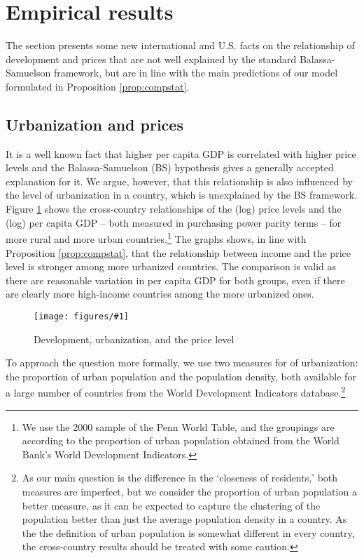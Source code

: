 \documentclass[12pt]{article}
\newcommand{\dofigure}[2]{\begin{figure}
\begin{centering}
\texttt{[image: figures/\#1]}
  \caption{#2\label{fig:#1}}
\end{centering}
\end{figure}}
\begin{document}


\section{Empirical results}\label{empirics}
The section presents some new international and U.S. facts on the relationship of development and prices that are not well explained by the standard Balassa-Samuelson framework, but are in line with the main predictions of our model formulated in Proposition \ref{prop:compstat}.

\subsection{Urbanization and prices}
It is a well known fact that higher per capita GDP is correlated with higher price levels and the Balassa-Samuelson (BS) hypothesis gives a generally accepted explanation for it. We argue, however, that this relationship is also influenced by the level of urbanization in a country, which is unexplained by the BS framework. Figure \ref{fig:sc_penn} shows the cross-country relationships of the (log) price levels and the (log) per capita GDP -- both measured in purchasing power parity terms -- for more rural and more urban countries.\footnote{We use the 2000 sample of the Penn World Table, and the groupings are according to the proportion of urban population obtained from the World Bank's World Development Indicators.} The graphs shows, in line with Proposition \ref{prop:compstat}, that the relationship between income and the price level is stronger among more urbanized countries. The comparison is valid as there are reasonable variation in per capita GDP for both groups, even if there are clearly more high-income countries among the more urbanized ones.

\dofigure{sc_penn}{Development, urbanization, and the price level}

To approach the question more formally, we use two measures for of urbanization: the proportion of urban population and the population density, both available for a large number of countries from the World Development Indicators database.\footnote{As our main question is the difference in the `closeness of residents,' both measures are imperfect, but we consider the proportion of urban population a better measure, as it can be expected to capture the clustering of the population better than just the average population density in a country. As the the definition of urban population is somewhat different in every country, the cross-country results should be treated with some caution.}
\end{document}
